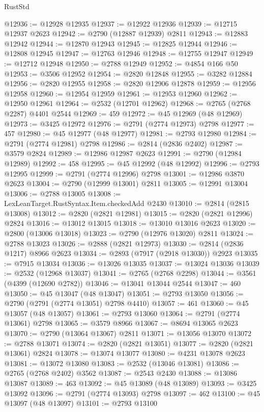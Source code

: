 \begin{lexlean}{RustStd}
\begin{coremodule}
@12936 := @12928 @12935
@12937 := @12922 @12936
@12939 := @12715 @12937 @2623
@12942 := @2790 (@12887 @12939) @2811
@12943 := @12883 @12942
@12944 := @12870 @12943
@12945 := @12825 @12944
@12946 := @12808 @12945
@12947 := @12763 @12946
@12948 := @12755 @12947
@12949 := @12712 @12948
@12950 := @2788 @12949
@12952 := @4854 @166 @50
@12953 := @3506 @12952
@12954 := @2820 @12848
@12955 := @3282 @12884
@12956 := @2820 @12955
@12958 := @2820 @12906 @12878
@12959 := @12956 @12958
@12960 := @12954 @12959
@12961 := @12953 @12960
@12962 := @12950 @12961
@12964 := @2532 (@12701 @12962)
@12968 := @2765 (@2768 @2287) @4401 @2544
@12969 := 459
@12972 := @45 @12969 (@48 @12969)
@12973 := @3425 @12972
@12976 := @2791 (@2774 @12973) @2798
@12977 := 457
@12980 := @45 @12977 (@48 @12977)
@12981 := @2793 @12980
@12984 := @2791 (@2774 @12981) @2798
@12986 := @2814 (@2836 @2402)
@12987 := @3579 @2824
@12989 := @12986 @12987 @2623
@12991 := @2790 (@12984 @12989)
@12992 := 458
@12995 := @45 @12992 (@48 @12992)
@12996 := @2793 @12995
@12999 := @2791 (@2774 @12996) @2798
@13001 := @12986 @3870 @2623
@13004 := @2790 (@12999 @13001) @2811
@13005 := @12991 @13004
@13006 := @2788 @13005
@13008 := LexLeanTarget.RustSyntax.Item.checkedAdd @2430
@13010 := @2814 (@2815 @13008)
@13012 := @2820 (@2821 @12981)
@13015 := @2820 (@2821 @12996) @2824
@13016 := @13012 @13015
@13018 := @13010 @13016 @2623
@13020 := @2800 (@13006 @13018)
@13023 := @2790 (@12976 @13020) @2811
@13024 := @2788 @13023
@13026 := @2888 (@2821 @12973)
@13030 := @2814 (@2836 @1217) @8966 @2623
@13034 := @2893 (@7917 (@2918 @13030)) @2923
@13035 := @7915 @13034
@13036 := @13026 @13035
@13037 := @13024 @13036
@13039 := @2532 (@12968 @13037)
@13041 := @2765 (@2768 @2298)
@13044 := @3561 (@4399 (@12690 @2782))
@13046 := @13041 @13044 @2544
@13047 := 460
@13050 := @45 @13047 (@48 @13047)
@13051 := @2793 @13050
@13056 := @2790 (@2791 (@2774 @13051) @2798 @4410)
@13057 := 461
@13060 := @45 @13057 (@48 @13057)
@13061 := @2793 @13060
@13064 := @2791 (@2774 @13061) @2798
@13065 := @3579 @8966
@13067 := @8694 @13065 @2623
@13070 := @2790 (@13064 @13067) @2811
@13071 := @13056 @13070
@13072 := @2788 @13071
@13074 := @2820 (@2821 @13051)
@13077 := @2820 (@2821 @13061) @2824
@13078 := @13074 @13077
@13080 := @4231 @13078 @2623
@13081 := @13072 @13080
@13083 := @2532 (@13046 @13081)
@13086 := @2765 (@2768 @2402) @3562
@13087 := @2543 @2430
@13088 := @13086 @13087
@13089 := 463
@13092 := @45 @13089 (@48 @13089)
@13093 := @3425 @13092
@13096 := @2791 (@2774 @13093) @2798
@13097 := 462
@13100 := @45 @13097 (@48 @13097)
@13101 := @2793 @13100

\end{coremodule}
\end{lexlean}
